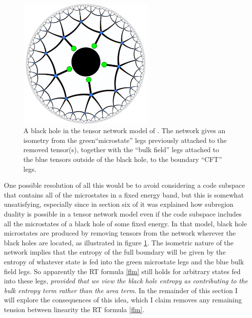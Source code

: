\documentclass[12pt]{article}
\newcommand{\bfig}{\begin{figure}\begin{center}}
\newcommand{\efig}{\end{center}\end{figure}}
\begin{document}
\bfig
\includegraphics[height=6.5cm]{blackhole2.pdf}
\caption{A black hole in the tensor network model of \cite{Pastawski:2015qua}. The network gives an isometry from the green``microstate'' legs previously attached to the removed tensor(s), together with the ``bulk field'' legs attached to the blue tensors outside of the black hole, to the boundary ``CFT'' legs.}\label{blackhole2}
\efig
One possible resolution of all this would be to avoid considering a code subspace that contains all of the microstates in a fixed energy band, but this is somewhat unsatisfying, especially since in section six of \cite{Pastawski:2015qua} it was explained how subregion duality is possible in a tensor network model even if the code subspace includes all the microstates of a black hole of some fixed energy.  In that model, black hole microstates are produced by removing tensors from the network wherever the black holes are located, as illustrated in figure \ref{blackhole2}.  The isometric nature of the network implies that the entropy of the full boundary will be given by the entropy of whatever state is fed into the green microstate legs and the blue bulk field legs.  So apparently the RT formula \eqref{flm} still holds for arbitrary states fed into these legs, \textit{provided that we view the black hole entropy as contributing to the bulk entropy term rather than the area term}.  In the remainder of this section I will explore the consequences of this idea, which I claim removes any remaining tension between linearity the RT formula \eqref{flm}.
\end{document}

